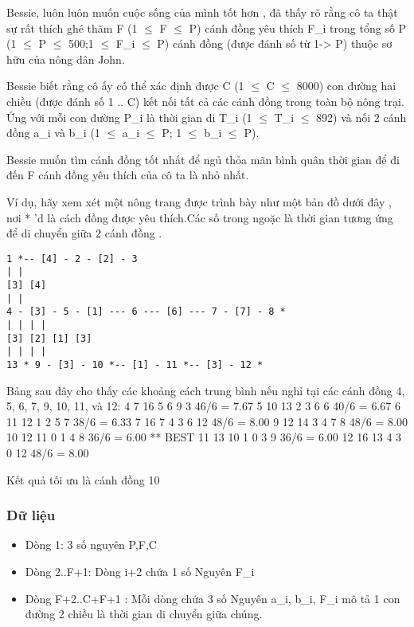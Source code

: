 



   Bessie, luôn luôn muốn cuộc sống của mình tốt hơn , đã thấy rõ rằng cô ta thật sự rất thích ghé thăm F (1  $\le$  F  $\le$  P) cánh đồng yêu thích F\_i trong tổng số P (1  $\le$  P  $\le$  500;1  $\le$  F\_i  $\le$  P) cánh đồng (được đánh số từ 1-> P) thuộc sơ hữu của nông dân John.  

   Bessie biết rằng cô ấy có thể xác định được C (1  $\le$  C  $\le$  8000) con đường hai chiều (được đánh số 1 .. C) kết nối tất cả các cánh đồng trong toàn bộ nông trại. Ứng với mỗi con đường P\_i là thời gian đi T\_i (1  $\le$  T\_i  $\le$  892) và nối 2 cánh đồng a\_i và b\_i (1  $\le$  a\_i  $\le$  P; 1  $\le$  b\_i  $\le$  P).  

   Bessie muốn tìm cánh đồng tốt nhất để ngủ thỏa mãn bình quân thời gian để đi đến F cánh đồng yêu thích của cô ta là nhỏ nhất.  

   Ví dụ, hãy xem xét một nông trang được trình bày như một bản đồ dưới đây , nơi * 'd là cách đồng được yêu thích.Các số trong ngoặc là thời gian tương ứng để di chuyển giữa 2 cánh đồng .  
\begin{verbatim}
1 *-- [4] - 2 - [2] - 3
| |
[3] [4]
| |
4 - [3] - 5 - [1] --- 6 --- [6] --- 7 - [7] - 8 *
| | | |
[3] [2] [1] [3]
| | | |
13 * 9 - [3] - 10 *-- [1] - 11 *-- [3] - 12 *
\end{verbatim}

   Bảng sau đây cho thấy các khoảng cách trung bình nếu nghỉ tại các cánh đồng 4, 5, 6, 7, 9, 10, 11, và 12: 4 7 16 5 6 9 3 46/6 = 7.67 5 10 13 2 3 6 6 40/6 = 6.67 6 11 12 1 2 5 7 38/6 = 6.33 7 16 7 4 3 6 12 48/6 = 8.00 9 12 14 3 4 7 8 48/6 = 8.00 10 12 11 0 1 4 8 36/6 = 6.00 ** BEST 11 13 10 1 0 3 9 36/6 = 6.00 12 16 13 4 3 0 12 48/6 = 8.00  

   Kết quả tối ưu là cánh đồng 10  

\subsubsection{   Dữ liệu  }
\begin{itemize}
	\item     Dòng 1: 3 số nguyên P,F,C   
	\item     Dòng 2..F+1: Dòng i+2 chứa 1 số Nguyên F\_i   
	\item     Dòng F+2..C+F+1 : Mỗi dòng chứa 3 số Nguyên a\_i, b\_i, F\_i mô tả 1 con đường 2 chiều là thời gian di chuyển giữa chúng.   
\end{itemize}

